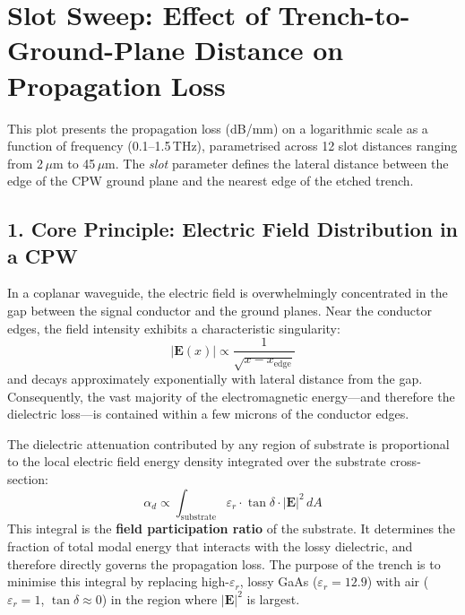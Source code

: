 
\section*{Slot Sweep: Effect of Trench-to-Ground-Plane Distance on Propagation Loss}

This plot presents the propagation loss (dB/mm) on a logarithmic scale as a function of frequency (0.1--1.5\,THz), parametrised across 12 slot distances ranging from 2\,$\mu$m to 45\,$\mu$m. The \textit{slot} parameter defines the lateral distance between the edge of the CPW ground plane and the nearest edge of the etched trench.

\subsection*{1. Core Principle: Electric Field Distribution in a CPW}

In a coplanar waveguide, the electric field is overwhelmingly concentrated in the gap between the signal conductor and the ground planes. Near the conductor edges, the field intensity exhibits a characteristic singularity:
\begin{equation}
    |\mathbf{E}(x)| \propto \frac{1}{\sqrt{x - x_{\mathrm{edge}}}}
\end{equation}
and decays approximately exponentially with lateral distance from the gap. Consequently, the vast majority of the electromagnetic energy---and therefore the dielectric loss---is contained within a few microns of the conductor edges.

The dielectric attenuation contributed by any region of substrate is proportional to the local electric field energy density integrated over the substrate cross-section:
\begin{equation}
    \alpha_d \propto \int_{\mathrm{substrate}} \varepsilon_r \cdot \tan\delta \cdot |\mathbf{E}|^2 \, dA
\end{equation}
This integral is the \textbf{field participation ratio} of the substrate. It determines the fraction of total modal energy that interacts with the lossy dielectric, and therefore directly governs the propagation loss. The purpose of the trench is to minimise this integral by replacing high-$\varepsilon_r$, lossy GaAs ($\varepsilon_r = 12.9$) with air ($\varepsilon_r = 1$, $\tan\delta \approx 0$) in the region where $|\mathbf{E}|^2$ is largest.

